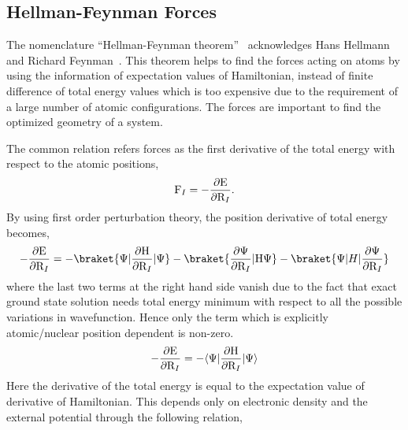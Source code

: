 \subsection{Hellman-Feynman Forces}
\begin{sloppypar}
The nomenclature ``Hellman-Feynman theorem'' ~acknowledges Hans Hellmann~\citep{Hellmann1939} and Richard Feynman~\citep{Feynman1939}. This theorem helps to find the forces acting on atoms by using the information of expectation values of Hamiltonian, instead of finite difference of total energy values which is too expensive due to the requirement of a large number of atomic configurations. The forces are important to find the optimized geometry of a system.
\end{sloppypar}
 
The common relation refers forces as the first derivative of the total energy with respect to the atomic positions, 
\begin{equation}
{\rm F}_I = - \frac{\partial {\rm E} }{\partial {\rm R}_I}.
\label{HeF1}
\end{equation} 
By using first order perturbation theory, the position derivative of total energy becomes, 
\begin{equation}\label{HeF2}
- \frac{\partial {\rm E} }{\partial {\rm R}_I}
= - \braket{\Psi | \frac{\partial \rm H}{\partial {\rm R}_I} | \Psi}
  - \braket{\frac{\partial \Psi}{\partial {\rm R}_I} | {\rm H}\Psi}
  - \braket{\Psi | H | \frac{\partial \Psi}{\partial {\rm R}_I}}
\end{equation}
where the last two terms at the right hand side vanish due to the fact that exact ground state solution needs total energy minimum with respect to all the possible variations in wavefunction. Hence only the term which is explicitly atomic/nuclear position dependent is non-zero.
\begin{equation}
 - \frac{\partial {\rm E} }{\partial {\rm R}_I} = - \langle\Psi|\frac{\partial {\rm H}}{\partial {\rm R}_I} | \Psi\rangle
\end{equation}
Here the derivative of the total energy is equal to the expectation value of derivative of Hamiltonian. This depends only on electronic density and the external potential through the following relation, 
